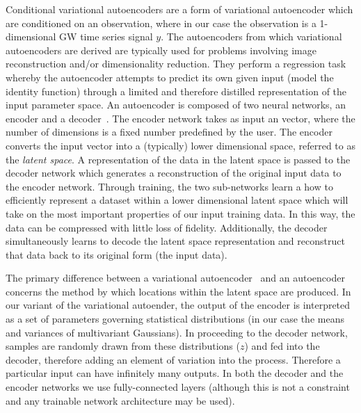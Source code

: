 \documentclass[%
showpacs,
 amsmath,amssymb,
 aps,
 twocolumn,
 prl,
 reprint,
floatfix,
]{revtex4-1}
\begin{document}
%
%
Conditional variational autoencoders are a form of variational autoencoder
which are conditioned on an observation, where in our case the observation is a
1-dimensional \ac{GW} time series signal $y$. The autoencoders from which
variational autoencoders are derived are typically used for problems involving
image reconstruction and/or dimensionality reduction. They perform a regression
task whereby the autoencoder attempts to predict its own given input (model the
identity function) through a limited and therefore distilled representation of
the input parameter space. An autoencoder is composed of two neural networks,
an encoder and a decoder~\cite{LIOU20083150}. The encoder network takes as
input an vector, where the number of dimensions is a fixed number predefined by
the user. The encoder converts the input vector into a (typically) lower
dimensional space, referred to as the {\it{latent space}}. A representation of
the data in the latent space is passed to the decoder network which generates a
reconstruction of the original input data to the encoder network. Through
training, the two sub-networks learn a how to efficiently represent a dataset
within a lower dimensional latent space which will take on the most important
properties of our input training data. In this way, the data can be compressed
with little loss of fidelity. Additionally, the decoder simultaneously learns
to decode the latent space representation and reconstruct that data back to its
original form (the input data). 

%
%
The primary difference between a variational autoencoder~\cite{1812.04405} and
an autoencoder concerns the method by which locations within the latent space
are produced. In our variant of the variational autoender, the output of the
encoder is interpreted as a set of parameters governing statistical
distributions (in our case the means and variances of multivariant Gaussians).
In proceeding to the decoder network, samples are randomly drawn from these
distributions ($z$) and fed into the decoder, therefore adding an element of
variation into the process. Therefore a particular input can have infinitely
many outputs. In both the decoder and the encoder networks we use
fully-connected layers (although this is not a constraint and any trainable
network architecture may be used).
\end{document}
